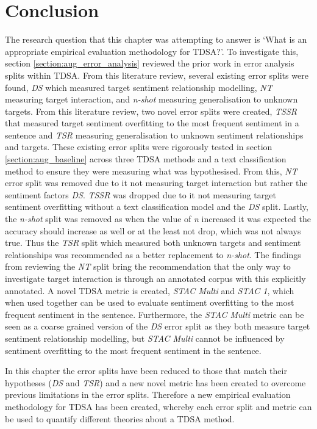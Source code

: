 \section{Conclusion}
The research question that this chapter was attempting to answer is  `What is an appropriate empirical evaluation methodology for TDSA?'. To investigate this, section \ref{section:aug_error_analysis} reviewed the prior work in error analysis splits within TDSA. From this literature review, several existing error splits were found, \textit{DS} which measured target sentiment relationship modelling, \textit{NT} measuring target interaction, and \textit{n-shot} measuring generalisation to unknown targets. From this literature review, two novel error splits were created, \textit{TSSR} that measured target sentiment overfitting to the most frequent sentiment in a sentence and \textit{TSR} measuring generalisation to unknown sentiment relationships and targets. These existing error splits were rigorously tested in section \ref{section:aug_baseline} across three TDSA methods and a text classification method to ensure they were measuring what was hypothesised. From this, \textit{NT} error split was removed due to it not measuring target interaction but rather the sentiment factors \textit{DS}. \textit{TSSR} was dropped due to it not measuring target sentiment overfitting without a text classification model and the \textit{DS} split. Lastly, the \textit{n-shot} split was removed as when the value of \textit{n} increased it was expected the accuracy should increase as well or at the least not drop, which was not always true. Thus the \textit{TSR} split which measured both unknown targets and sentiment relationships was recommended as a better replacement to \textit{n-shot}. The findings from reviewing the \textit{NT} split bring the recommendation that the only way to investigate target interaction is through an annotated corpus with this explicitly annotated. A novel TDSA metric is created, \textit{STAC Multi} and \textit{STAC 1}, which when used together can be used to evaluate sentiment overfitting to the most frequent sentiment in the sentence. Furthermore, the \textit{STAC Multi} metric can be seen as a coarse grained version of the \textit{DS} error split as they both measure target sentiment relationship modelling, but \textit{STAC Multi} cannot be influenced by sentiment overfitting to the most frequent sentiment in the sentence. 

In this chapter the error splits have been reduced to those that match their hypotheses (\textit{DS} and \textit{TSR}) and a new novel metric has been created to overcome previous limitations in the error splits. Therefore a new empirical evaluation methodology for TDSA has been created, whereby each error split and metric can be used to quantify different theories about a TDSA method.





